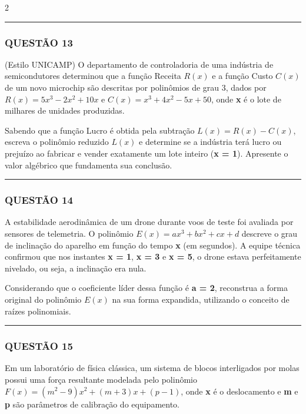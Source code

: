 \documentclass[11pt, a4paper]{article}
\begin{document}
\begin{multicols*}{2}
\vspace{0cm} \noindent\textcolor{CorLinha}{\rule{\linewidth}{0.5pt}} \vspace{-0.2cm}
\subsubsection*{QUESTÃO 13}

(Estilo UNICAMP) O departamento de controladoria de uma indústria de semicondutores determinou que a função Receita $ R(x) $ e a função Custo $ C(x) $ de um novo microchip são descritas por polinômios de grau 3, dados por $ R(x) = 5x^3 - 2x^2 + 10x $ e $ C(x) = x^3 + 4x^2 - 5x + 50 $, onde \textbf{x} é o lote de milhares de unidades produzidas.

Sabendo que a função Lucro é obtida pela subtração $ L(x) = R(x) - C(x) $, escreva o polinômio reduzido $ L(x) $ e determine se a indústria terá lucro ou prejuízo ao fabricar e vender exatamente um lote inteiro (\textbf{x = 1}). Apresente o valor algébrico que fundamenta sua conclusão.

\vspace{0cm} \noindent\textcolor{CorLinha}{\rule{\linewidth}{0.5pt}} \vspace{-0.2cm}
\subsubsection*{QUESTÃO 14}

A estabilidade aerodinâmica de um drone durante voos de teste foi avaliada por sensores de telemetria. O polinômio $ E(x) = ax^3 + bx^2 + cx + d $ descreve o grau de inclinação do aparelho em função do tempo \textbf{x} (em segundos). A equipe técnica confirmou que nos instantes \textbf{x = 1}, \textbf{x = 3} e \textbf{x = 5}, o drone estava perfeitamente nivelado, ou seja, a inclinação era nula.

Considerando que o coeficiente líder dessa função é \textbf{a = 2}, reconstrua a forma original do polinômio $ E(x) $ na sua forma expandida, utilizando o conceito de raízes polinomiais.

\vspace{0cm} \noindent\textcolor{CorLinha}{\rule{\linewidth}{0.5pt}} \vspace{-0.2cm}
\subsubsection*{QUESTÃO 15}

Em um laboratório de física clássica, um sistema de blocos interligados por molas possui uma força resultante modelada pelo polinômio $ F(x) = (m^2 - 9)x^2 + (m + 3)x + (p - 1) $, onde \textbf{x} é o deslocamento e \textbf{m} e \textbf{p} são parâmetros de calibração do equipamento.


\end{multicols*}
\end{document}
